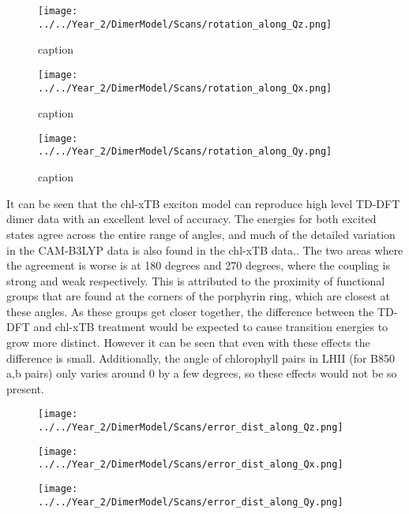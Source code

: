 \begin{figure}
    \centering
    \texttt{[image: ../../Year\_2/DimerModel/Scans/rotation\_along\_Qz.png]}
    \caption{caption}
\end{figure}

\begin{figure}
    \centering
    \texttt{[image: ../../Year\_2/DimerModel/Scans/rotation\_along\_Qx.png]}
    \caption{caption}
\end{figure}

\begin{figure}
    \centering
    \texttt{[image: ../../Year\_2/DimerModel/Scans/rotation\_along\_Qy.png]}
    \caption{caption}
\end{figure}

It can be seen that the chl-xTB exciton model can reproduce high level TD-DFT dimer
data with an excellent level of accuracy. The energies for both excited states agree
across the entire range of angles, and much of the detailed variation in the CAM-B3LYP
data is also found in the chl-xTB data.. The two areas where the agreement is worse
is at 180 degrees and 270 degrees, where the coupling is strong and weak respectively.
This is attributed to the proximity of functional groups that are found at the
corners of the porphyrin ring, which are closest at these angles. As these groups
get closer together, the difference between the TD-DFT and chl-xTB treatment would
be expected to cause transition energies to grow more distinct. However it can be
seen that even with these effects the difference is small. Additionally, the angle
of chlorophyll pairs in LHII (for B850 a,b pairs) only varies around 0 by a few 
degrees, so these effects would not be so present.

\begin{figure}
    \centering
    \texttt{[image: ../../Year\_2/DimerModel/Scans/error\_dist\_along\_Qz.png]}
    \label{fig:errror_along_qy}
\end{figure}

\begin{figure}
    \centering
    \texttt{[image: ../../Year\_2/DimerModel/Scans/error\_dist\_along\_Qx.png]}
    \label{fig:errror_along_qy}
\end{figure}

\begin{figure}
    \centering
    \texttt{[image: ../../Year\_2/DimerModel/Scans/error\_dist\_along\_Qy.png]}
    \label{fig:errror_along_qy}
\end{figure}

